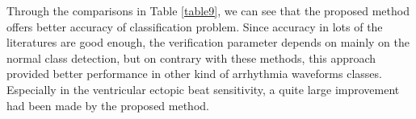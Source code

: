 \documentclass[journal]{IEEEtran}
\begin{document}
Through the comparisons in Table \ref{table9}, we can see that the proposed method offers better accuracy of classification problem. Since accuracy in lots of the literatures are good enough, the verification parameter depends on mainly on the normal class detection, but on contrary with these methods, this approach provided better performance in other kind of arrhythmia waveforms classes. Especially in the ventricular ectopic beat sensitivity, a quite large improvement had been made by the proposed method.



\end{document}

